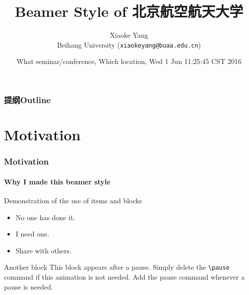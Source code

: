 \documentclass[10pt]{beamer}
\title{Beamer Style of 北京航空航天大学}
\author{Xiaoke Yang\\
Beihang University (\texttt{xiaokeyang@buaa.edu.cn})}
\date{What seminar/conference, Which location, Wed  1 Jun 11:25:45 CST 2016}
\begin{document}
\begin{CJK*}{UTF8}{gbsn}

\begin{frame}[plain]
\maketitle
\end{frame}

\begin{frame}
\frametitle{提纲Outline}
\tableofcontents
\end{frame}
\section{Motivation}
\begin{frame}
\frametitle{Motivation}
\framesubtitle{Why I made this beamer style}
\begin{block}{Demonstration of the use of items and blocks}
\begin{itemize}
\item No one has done it.
\item I need one.
\pause \item Share with others.
\end{itemize}
\end{block}
\pause
\begin{block}{Another block}
This block appears after a pause. Simply delete the \texttt{\textbackslash pause} command if this animation is not needed. Add the pause command whenever a pause is needed. 
\end{block}
\end{frame}


\end{CJK*}
\end{document}
